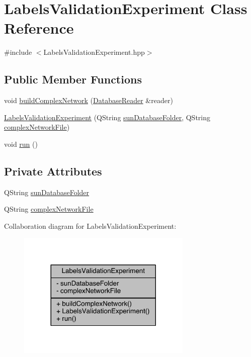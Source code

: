\hypertarget{class_labels_validation_experiment}{\section{Labels\+Validation\+Experiment Class Reference}
\label{class_labels_validation_experiment}
}


{\ttfamily \#include $<$Labels\+Validation\+Experiment.\+hpp$>$}

\subsection*{Public Member Functions}
\begin{DoxyCompactItemize}
\item 
void \hyperlink{class_labels_validation_experiment_a139af12709f865656435f2c9812c0567}{build\+Complex\+Network} (\hyperlink{class_database_reader}{Database\+Reader} \&reader)
\item 
\hyperlink{class_labels_validation_experiment_aa97011a79f94d2e2c70a9f53dc6a2afc}{Labels\+Validation\+Experiment} (Q\+String \hyperlink{class_labels_validation_experiment_a13c47376d09961370b63902e98d38fb1}{sun\+Database\+Folder}, Q\+String \hyperlink{class_labels_validation_experiment_a436f830f66b934412219500367a08b9f}{complex\+Network\+File})
\item 
void \hyperlink{class_labels_validation_experiment_a139b4fc02f5bced4f013c0a025d66011}{run} ()
\end{DoxyCompactItemize}
\subsection*{Private Attributes}
\begin{DoxyCompactItemize}
\item 
Q\+String \hyperlink{class_labels_validation_experiment_a13c47376d09961370b63902e98d38fb1}{sun\+Database\+Folder}
\item 
Q\+String \hyperlink{class_labels_validation_experiment_a436f830f66b934412219500367a08b9f}{complex\+Network\+File}
\end{DoxyCompactItemize}


Collaboration diagram for Labels\+Validation\+Experiment\+:\nopagebreak
\begin{figure}[H]
\begin{center}
\leavevmode
\includegraphics[width=236pt]{class_labels_validation_experiment__coll__graph}
\end{center}
\end{figure}


